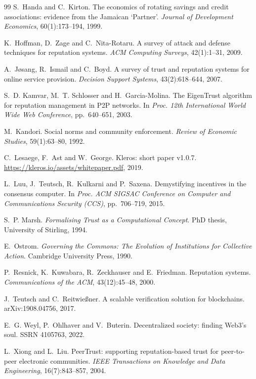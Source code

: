 \documentclass[11pt,a4paper]{article}
\theoremstyle{plain}
\theoremstyle{definition}
\theoremstyle{remark}
\newcommand{\1}{\mathbf{1}}
\begin{document}
\begin{thebibliography}{99}
S.~Handa and C.~Kirton.
The economics of rotating savings and credit associations: evidence from the
Jamaican `Partner'.
\emph{Journal of Development Economics}, 60(1):173--194, 1999.

K.~Hoffman, D.~Zage and C.~Nita-Rotaru.
A survey of attack and defense techniques for reputation systems.
\emph{ACM Computing Surveys}, 42(1):1--31, 2009.

A.~Jøsang, R.~Ismail and C.~Boyd.
A survey of trust and reputation systems for online service provision.
\emph{Decision Support Systems}, 43(2):618--644, 2007.

S.~D. Kamvar, M.~T. Schlosser and H.~Garcia-Molina.
The EigenTrust algorithm for reputation management in P2P networks.
In \emph{Proc. 12th International World Wide Web Conference}, pp.~640--651, 2003.

M.~Kandori.
Social norms and community enforcement.
\emph{Review of Economic Studies}, 59(1):63--80, 1992.

C.~Lesaege, F.~Ast and W.~George.
Kleros: short paper v1.0.7.
\url{https://kleros.io/assets/whitepaper.pdf}, 2019.

L.~Luu, J.~Teutsch, R.~Kulkarni and P.~Saxena.
Demystifying incentives in the consensus computer.
In \emph{Proc. ACM SIGSAC Conference on Computer and Communications Security
(CCS)}, pp.~706--719, 2015.

S.~P. Marsh.
\emph{Formalising Trust as a Computational Concept}.
PhD thesis, University of Stirling, 1994.

E.~Ostrom.
\emph{Governing the Commons: The Evolution of Institutions for Collective
Action}. Cambridge University Press, 1990.

P.~Resnick, K.~Kuwabara, R.~Zeckhauser and E.~Friedman.
Reputation systems.
\emph{Communications of the ACM}, 43(12):45--48, 2000.

J.~Teutsch and C.~Reitwießner.
A scalable verification solution for blockchains.
arXiv:1908.04756, 2017.

E.~G. Weyl, P.~Ohlhaver and V.~Buterin.
Decentralized society: finding Web3's soul.
SSRN 4105763, 2022.

L.~Xiong and L.~Liu.
PeerTrust: supporting reputation-based trust for peer-to-peer electronic
communities.
\emph{IEEE Transactions on Knowledge and Data Engineering}, 16(7):843--857, 2004.

\end{thebibliography}
\end{document}
